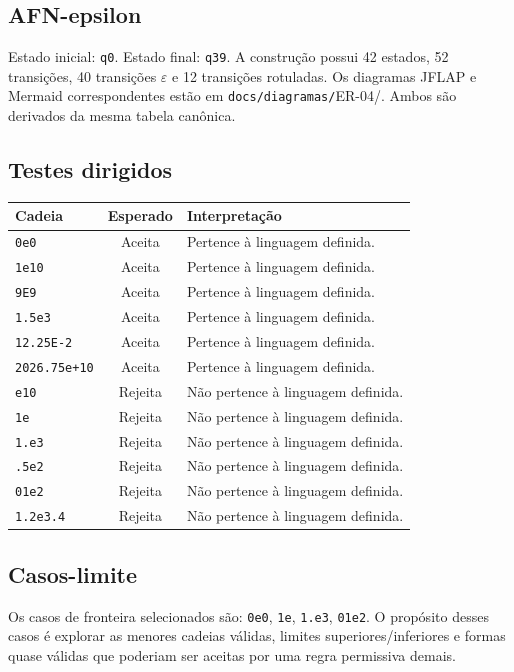 \subsection{AFN-epsilon}
Estado inicial: \texttt{q0}. Estado final: \texttt{q39}. A construção possui 42 estados, 52 transições, 40 transições $\varepsilon$ e 12 transições rotuladas.
Os diagramas JFLAP e Mermaid correspondentes estão em \texttt{docs/diagramas/}ER-04/. Ambos são derivados da mesma tabela canônica.
\subsection{Testes dirigidos}
\begin{center}
\small
\begin{tabular}{|p{}|c|p{}|}
\toprule
Cadeia & Esperado & Interpretação \\
\midrule
\texttt{0e0} & Aceita & Pertence à linguagem definida. \\
\texttt{1e10} & Aceita & Pertence à linguagem definida. \\
\texttt{9E9} & Aceita & Pertence à linguagem definida. \\
\texttt{1.5e3} & Aceita & Pertence à linguagem definida. \\
\texttt{12.25E-2} & Aceita & Pertence à linguagem definida. \\
\texttt{2026.75e+10} & Aceita & Pertence à linguagem definida. \\
\texttt{e10} & Rejeita & Não pertence à linguagem definida. \\
\texttt{1e} & Rejeita & Não pertence à linguagem definida. \\
\texttt{1.e3} & Rejeita & Não pertence à linguagem definida. \\
\texttt{.5e2} & Rejeita & Não pertence à linguagem definida. \\
\texttt{01e2} & Rejeita & Não pertence à linguagem definida. \\
\texttt{1.2e3.4} & Rejeita & Não pertence à linguagem definida. \\
\bottomrule
\end{tabular}
\end{center}
\subsection{Casos-limite}
Os casos de fronteira selecionados são: \texttt{0e0}, \texttt{1e}, \texttt{1.e3}, \texttt{01e2}.
\medskip
O propósito desses casos é explorar as menores cadeias válidas, limites superiores/inferiores e formas quase válidas que poderiam ser aceitas por uma regra permissiva demais.

